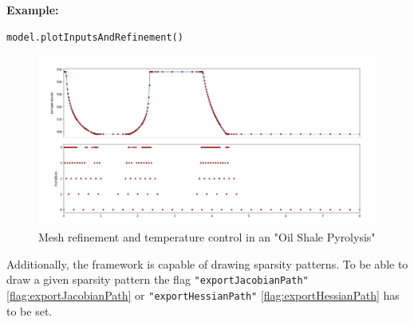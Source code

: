 \documentclass[12pt]{article}
\begin{document}
\begin{mdframed}[backgroundcolor=gray!10, roundcorner=10pt,
		linewidth=1pt]
	\textbf{Example:}
	\begin{lstlisting}
model.plotInputsAndRefinement()
\end{lstlisting}
	\begin{figure}[H]
		\centering
		\includegraphics[width=1\textwidth]{images/refinement.png}
		\caption{Mesh refinement and temperature control in an "Oil Shale
			Pyrolysis"}
		\label{fig:osp}
	\end{figure}
\end{mdframed}

Additionally, the framework is capable of drawing sparsity patterns. To be able
to draw a given sparsity pattern the flag \texttt{"exportJacobianPath"}
\eqref{flag:exportJacobianPath} or \texttt{"exportHessianPath"}
\eqref{flag:exportHessianPath} has to be set.
\end{document}
